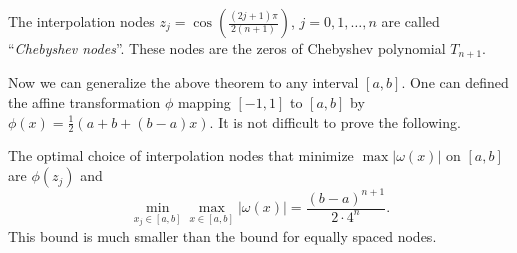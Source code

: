 \begin{definition}
    The interpolation nodes $z_j = \cos(\frac{(2j+1)\pi}{2(n+1)})$, $j = 0, 1, \dots, n$ are called ``\textit{Chebyshev nodes}''. These nodes are the zeros of Chebyshev polynomial $T_{n+1}$.
\end{definition}
Now we can generalize the above theorem to any interval $[a, b]$. One can defined the affine transformation $\phi$ mapping $[-1,1]$ to $[a, b]$ by $\phi(x) = \frac{1}{2} (a + b + (b-a)x)$. It is not difficult to prove the following.
\begin{corollary}
\label{Cor: 2-Che-err-any}
    The optimal choice of interpolation nodes that minimize $\max |\omega(x)|$ on $[a, b]$ are $\phi(z_j)$ and 
   $$\min_{x_j\in [a, b]} \max_{x\in [a, b]} |\omega(x)| = \frac{(b-a)^{n+1}}{2\cdot 4^n}.$$
   This bound is much smaller than the bound for equally spaced nodes.
\end{corollary}

